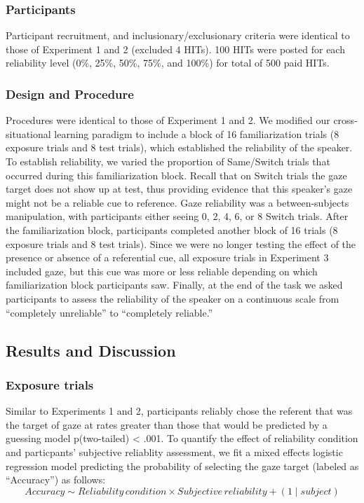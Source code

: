 \documentclass[a4paper,man,floatsintext]{apa6}
\begin{document}
\subsubsection{Participants}\label{participants-2}

Participant recruitment, and inclusionary/exclusionary criteria were
identical to those of Experiment 1 and 2 (excluded 4 HITs). 100 HITs
were posted for each reliability level (0\%, 25\%, 50\%, 75\%, and
100\%) for total of 500 paid HITs.

\subsubsection{Design and Procedure}\label{design-and-procedure-2}

Procedures were identical to those of Experiment 1 and 2. We modified
our cross-situational learning paradigm to include a block of 16
familiarization trials (8 exposure trials and 8 test trials), which
established the reliability of the speaker. To establish reliability, we
varied the proportion of Same/Switch trials that occurred during this
familiarization block. Recall that on Switch trials the gaze target does
not show up at test, thus providing evidence that this speaker's gaze
might not be a reliable cue to reference. Gaze reliability was a
between-subjects manipulation, with participants either seeing 0, 2, 4,
6, or 8 Switch trials. After the familiarization block, participants
completed another block of 16 trials (8 exposure trials and 8 test
trials). Since we were no longer testing the effect of the presence or
absence of a referential cue, all exposure trials in Experiment 3
included gaze, but this cue was more or less reliable depending on which
familiarization block participants saw. Finally, at the end of the task
we asked participants to assess the reliability of the speaker on a
continuous scale from ``completely unreliable'' to ``completely
reliable.''

\subsection{Results and Discussion}\label{results-and-discussion-2}

\subsubsection{Exposure trials}\label{exposure-trials-2}

Similar to Experiments 1 and 2, participants reliably chose the referent
that was the target of gaze at rates greater than those that would be
predicted by a guessing model p(two-tailed) \textless{} .001. To
quantify the effect of reliability condition and particpants' subjective
reliablity assessment, we fit a mixed effects logistic regression model
predicting the probability of selecting the gaze target (labeled as
``Accuracy'') as follows:
\[Accuracy  \sim Reliability \, condition \times Subjective \, reliability + (1 \mid subject)\]
\end{document}
